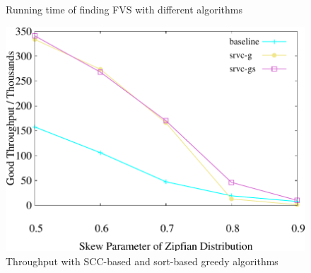 \begin{figure}[t]
\begin{minipage}[b]{0.32\linewidth}
        \vspace{-2em}
        \caption{Running time of finding FVS with different algorithms}
        \label{fig:fvs:latency}
    \end{minipage}
    \begin{minipage}[b]{0.32\linewidth}
        \centering
        \includegraphics[width=\textwidth]{./exp_fig/fvs/tps}
        \vspace{-2em}
        \caption{Throughput with SCC-based and sort-based greedy algorithms}
        \label{fig:fvs:tps}
    \end{minipage}
    \vspace{-1em}
\end{figure}

